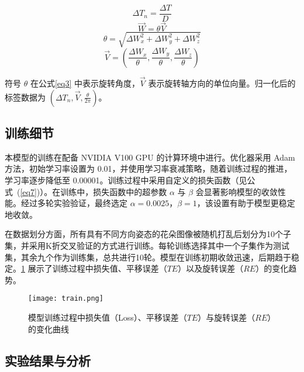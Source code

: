 \begin{equation}
	\label{eq1}
	\Delta T_{n} = \frac{\Delta T}{D}
\end{equation}
\begin{equation}
	\label{eq2}
	\overrightarrow{W} = \theta\overrightarrow{V}
\end{equation}
\begin{equation}
	\label{eq3}
	\theta = \sqrt{\Delta W_{x}^{2} + \Delta W_{y}^{2} + \Delta W_{z}^{2}}
\end{equation}
\begin{equation}
	\label{eq4}
	\overrightarrow{V} = \left(\frac{\Delta W_{x}}{\theta},\frac{\Delta W_{y}}{\theta},\frac{\Delta W_{z}}{\theta}\right)
\end{equation}

符号 $\theta$ 在公式\cref{eq3} 中表示旋转角度，$\overrightarrow{V}$ 表示旋转轴方向的单位向量。归一化后的标签数据为 $(\Delta T_{n}, \overrightarrow{V}, \frac{\theta}{2\pi})$。



\subsection{训练细节}

本模型的训练在配备 NVIDIA V100 GPU 的计算环境中进行。优化器采用 Adam 方法，初始学习率设置为 0.01，并使用学习率衰减策略，随着训练过程的推进，学习率逐步降低至 0.00001。训练过程中采用自定义的损失函数（见公式~(\ref{eq7})）。在训练中，损失函数中的超参数 $\alpha$ 与 $\beta$ 会显著影响模型的收敛性能。经过多轮实验验证，最终选定 $\alpha = 0.0025$，$\beta = 1$，该设置有助于模型更稳定地收敛。

在数据划分方面，所有具有不同方向姿态的花朵图像被随机打乱后划分为10个子集，并采用K折交叉验证的方式进行训练。每轮训练选择其中一个子集作为测试集，其余九个作为训练集，总共进行10轮。模型在训练初期收敛迅速，后期趋于稳定。\cref{fig:effective_r_3} 展示了训练过程中损失值、平移误差（$TE$）以及旋转误差（$RE$）的变化趋势。

\begin{figure}[htb]
	\texttt{[image: train.png]}
	\caption[模型训练过程中的变化曲线]{模型训练过程中损失值（Loss）、平移误差（$TE$）与旋转误差（$RE$）的变化曲线} %
	\label{fig:effective_r_3}
\end{figure}




\subsection{实验结果与分析}

